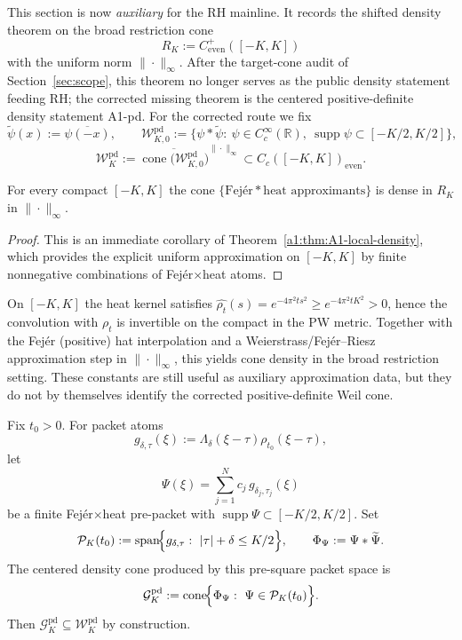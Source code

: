 
This section is now \emph{auxiliary} for the RH mainline. It records the shifted
density theorem on the broad restriction cone
\[
  R_K := C^+_{\mathrm{even}}([-K,K])
\]
with the uniform norm $\|\cdot\|_\infty$. After the target-cone audit of
Section~\ref{sec:scope}, this theorem no longer serves as the public density
statement feeding RH; the corrected missing theorem is the centered positive-definite
density statement A1-pd. For the corrected route we fix
\[
  \widetilde{\psi}(x):=\overline{\psi(-x)},
  \qquad
  \mathcal W_{K,0}^{\mathrm{pd}}
  :=\bigl\{\psi*\widetilde{\psi}:\ \psi\in C_c^\infty(\mathbb R),\ \operatorname{supp}\psi\subset[-K/2,K/2]\bigr\},
\]
\[
  \mathcal W_K^{\mathrm{pd}}
  :=\overline{\operatorname{cone}\!\bigl(\mathcal W_{K,0}^{\mathrm{pd}}\bigr)}^{\|\cdot\|_\infty}
  \subset C_c([-K,K])_{\mathrm{even}}.
\]

\begin{theorem}\label{thm:A1-density}
For every compact $[-K,K]$ the cone $\{\text{Fej\'er}*\text{heat approximants}\}$ is dense in $R_K$ in $\|\cdot\|_\infty$.
\end{theorem}
\begin{proof}
This is an immediate corollary of Theorem~\ref{a1:thm:A1-local-density}, which provides the explicit uniform approximation on $[-K,K]$ by finite nonnegative combinations of Fej\'er$\times$heat atoms.
\end{proof}

\begin{remark}[PW reinforcement]
On $[-K,K]$ the heat kernel satisfies $\widehat{\rho_t}(s)=e^{-4\pi^2 t s^2}\ge e^{-4\pi^2 t K^2}>0$, hence the convolution with $\rho_t$ is invertible on the compact in the PW metric. Together with the Fej\'er (positive) hat interpolation and a Weierstrass/Fej\'er--Riesz approximation step in $\|\cdot\|_{\infty}$, this yields cone density in the broad restriction setting. These constants are still useful as auxiliary approximation data, but they do not by themselves identify the corrected positive-definite Weil cone.
\end{remark}

\begin{definition}\label{def:pd-packet-cone}
Fix $t_0>0$. For packet atoms
\[
  g_{\delta,\tau}(\xi):=\Lambda_\delta(\xi-\tau)\rho_{t_0}(\xi-\tau),
\]
let
\[
  \Psi(\xi)=\sum_{j=1}^N c_j\,g_{\delta_j,\tau_j}(\xi)
\]
be a finite Fej\'er$\times$heat pre-packet with $\operatorname{supp}\Psi\subset[-K/2,K/2]$.
Set
\[
  \mathcal P_K(t_0)
  := \operatorname{span}\!\Bigl\{
      g_{\delta,\tau}:\ |\tau|+\delta\le K/2
    \Bigr\},
  \qquad
  \Phi_\Psi:=\Psi*\widetilde{\Psi}.
\]
The centered density cone produced by this pre-square packet space is
\[
  \mathcal G_K^{\mathrm{pd}}
  := \operatorname{cone}\!\Bigl\{
      \Phi_\Psi:\ \Psi\in \mathcal P_K(t_0)
    \Bigr\}.
\]
Then $\mathcal G_K^{\mathrm{pd}}\subseteq \mathcal W_K^{\mathrm{pd}}$ by construction.
\end{definition}

